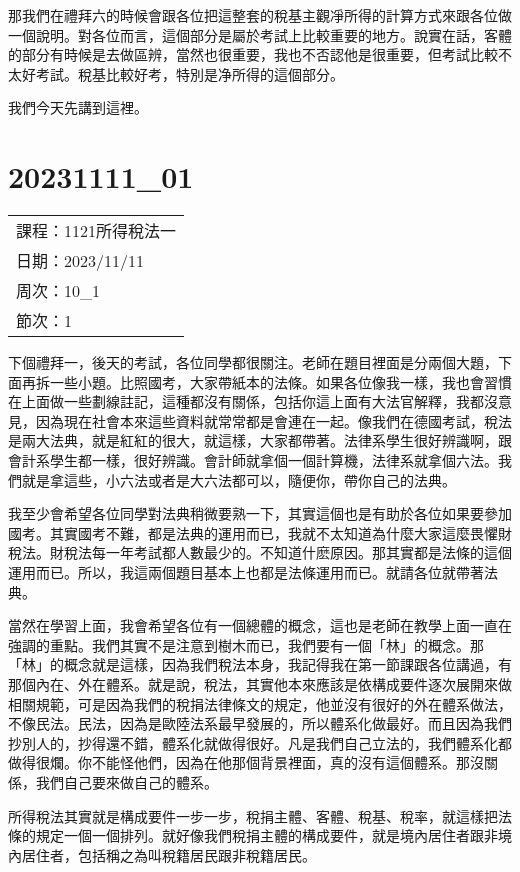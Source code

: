 \documentclass[]{ctexbook}
\begin{document}
那我們在禮拜六的時候會跟各位把這整套的稅基主觀凈所得的計算方式來跟各位做一個說明。對各位而言，這個部分是屬於考試上比較重要的地方。說實在話，客體的部分有時候是去做區辨，當然也很重要，我也不否認他是很重要，但考試比較不太好考試。稅基比較好考，特別是净所得的這個部分。

我們今天先講到這裡。

\hypertarget{section-19}{%
\chapter{20231111\_01}\label{section-19}}

\begin{longtable}[]{@{}l@{}}
\toprule()
\endhead
課程：1121所得稅法一 \\
日期：2023/11/11 \\
周次：10\_1 \\
節次：1 \\
\bottomrule()
\end{longtable}

下個禮拜一，後天的考試，各位同學都很關注。老師在題目裡面是分兩個大題，下面再拆一些小題。比照國考，大家帶紙本的法條。如果各位像我一樣，我也會習慣在上面做一些劃線註記，這種都沒有關係，包括你這上面有大法官解釋，我都沒意見，因為現在社會本來這些資料就常常都是會連在一起。像我們在德國考試，稅法是兩大法典，就是紅紅的很大，就這樣，大家都帶著。法律系學生很好辨識啊，跟會計系學生都一樣，很好辨識。會計師就拿個一個計算機，法律系就拿個六法。我們就是拿這些，小六法或者是大六法都可以，隨便你，帶你自己的法典。

我至少會希望各位同學對法典稍微要熟一下，其實這個也是有助於各位如果要參加國考。其實國考不難，都是法典的運用而已，我就不太知道為什麼大家這麼畏懼財稅法。財稅法每一年考試都人數最少的。不知道什麽原因。那其實都是法條的這個運用而已。所以，我這兩個題目基本上也都是法條運用而已。就請各位就帶著法典。

當然在學習上面，我會希望各位有一個總體的概念，這也是老師在教學上面一直在強調的重點。我們其實不是注意到樹木而已，我們要有一個「林」的概念。那「林」的概念就是這樣，因為我們稅法本身，我記得我在第一節課跟各位講過，有那個內在、外在體系。就是說，稅法，其實他本來應該是依構成要件逐次展開來做相關規範，可是因為我們的稅捐法律條文的規定，他並沒有很好的外在體系做法，不像民法。民法，因為是歐陸法系最早發展的，所以體系化做最好。而且因為我們抄別人的，抄得還不錯，體系化就做得很好。凡是我們自己立法的，我們體系化都做得很爛。你不能怪他們，因為在他那個背景裡面，真的沒有這個體系。那沒關係，我們自己要來做自己的體系。

所得稅法其實就是構成要件一步一步，稅捐主體、客體、稅基、稅率，就這樣把法條的規定一個一個排列。就好像我們稅捐主體的構成要件，就是境內居住者跟非境內居住者，包括稱之為叫稅籍居民跟非稅籍居民。
\end{document}
